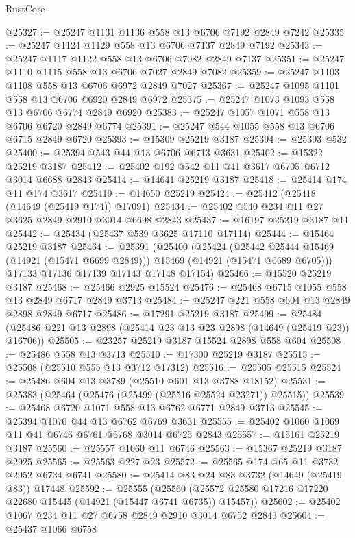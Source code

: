 \begin{lexlean}{RustCore}
\begin{coremodule}
@25327 := @25247 @1131 @1136 @558 @13 @6706 @7192 @2849 @7242
@25335 := @25247 @1124 @1129 @558 @13 @6706 @7137 @2849 @7192
@25343 := @25247 @1117 @1122 @558 @13 @6706 @7082 @2849 @7137
@25351 := @25247 @1110 @1115 @558 @13 @6706 @7027 @2849 @7082
@25359 := @25247 @1103 @1108 @558 @13 @6706 @6972 @2849 @7027
@25367 := @25247 @1095 @1101 @558 @13 @6706 @6920 @2849 @6972
@25375 := @25247 @1073 @1093 @558 @13 @6706 @6774 @2849 @6920
@25383 := @25247 @1057 @1071 @558 @13 @6706 @6720 @2849 @6774
@25391 := @25247 @544 @1055 @558 @13 @6706 @6715 @2849 @6720
@25393 := @15309 @25219 @3187
@25394 := @25393 @532
@25400 := @25394 @543 @44 @13 @6706 @6713 @3631
@25402 := @15322 @25219 @3187
@25412 := @25402 @192 @542 @11 @41 @3617 @6705 @6712 @3014 @6688 @2843
@25414 := @14641 @25219 @3187
@25418 := @25414 @174 @11 @174 @3617
@25419 := @14650 @25219
@25424 := @25412 (@25418 (@14649 (@25419 @174)) @17091)
@25434 := @25402 @540 @234 @11 @27 @3625 @2849 @2910 @3014 @6698 @2843
@25437 := @16197 @25219 @3187 @11
@25442 := @25434 (@25437 @539 @3625 @17110 @17114)
@25444 := @15464 @25219 @3187
@25464 := @25391
    (@25400
      (@25424
        (@25442 @25444 @15469 (@14921 (@15471 @6699 @2849)))
        @15469
        (@14921 (@15471 @6689 @6705)))
      @17133
      @17136
      @17139
      @17143
      @17148
      @17154)
@25466 := @15520 @25219 @3187
@25468 := @25466 @2925 @15524
@25476 := @25468 @6715 @1055 @558 @13 @2849 @6717 @2849 @3713
@25484 := @25247 @221 @558 @604 @13 @2849 @2898 @2849 @6717
@25486 := @17291 @25219 @3187
@25499 := @25484 (@25486 @221 @13 @2898 (@25414 @23 @13 @23 @2898 (@14649 (@25419 @23)) @16706))
@25505 := @23257 @25219 @3187 @15524 @2898 @558 @604
@25508 := @25486 @558 @13 @3713
@25510 := @17300 @25219 @3187
@25515 := @25508 (@25510 @555 @13 @3712 @17312)
@25516 := @25505 @25515
@25524 := @25486 @604 @13 @3789 (@25510 @601 @13 @3788 @18152)
@25531 := @25383 (@25464 (@25476 (@25499 (@25516 @25524 @23271)) @25515))
@25539 := @25468 @6720 @1071 @558 @13 @6762 @6771 @2849 @3713
@25545 := @25394 @1070 @44 @13 @6762 @6769 @3631
@25555 := @25402 @1060 @1069 @11 @41 @6746 @6761 @6768 @3014 @6725 @2843
@25557 := @15161 @25219 @3187
@25560 := @25557 @1060 @11 @6746
@25563 := @15367 @25219 @3187 @2925
@25565 := @25563 @227 @23
@25572 := @25565 @174 @65 @11 @3732 @2952 @6734 @6741
@25580 := @25414 @83 @24 @83 @3732 (@14649 (@25419 @83)) @17448
@25592 := @25555
    (@25560 (@25572 @25580 @17216 @17220 @22680 @15445 (@14921 (@15447 @6741 @6735)) @15457))
@25602 := @25402 @1067 @234 @11 @27 @6758 @2849 @2910 @3014 @6752 @2843
@25604 := @25437 @1066 @6758

\end{coremodule}
\end{lexlean}

